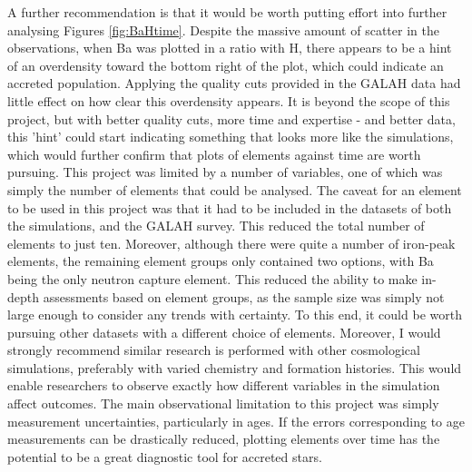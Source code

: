 \documentclass[fleqn,usenatbib]{mnras}
\begin{document}
A further recommendation is that it would be worth putting effort into further analysing Figures \ref{fig:BaHtime}. Despite the massive amount of scatter in the observations, when Ba was plotted in a ratio with H, there appears to be a hint of an overdensity toward the bottom right of the plot, which could indicate an accreted population. Applying the quality cuts provided in the GALAH data had little effect on how clear this overdensity appears. It is beyond the scope of this project, but with better quality cuts, more time and expertise - and better data, this 'hint' could start indicating something that looks more like the simulations, which would further confirm that plots of elements against time are worth pursuing.  
This project was limited by a number of variables, one of which was simply the number of elements that could be analysed. The caveat for an element to be used in this project was that it had to be included in the datasets of both the simulations, and the GALAH survey. This reduced the total number of elements to just ten. Moreover, although there were quite a number of iron-peak elements, the remaining element groups only contained two options, with Ba being the only neutron capture element. This reduced the ability to make in-depth assessments based on element groups, as the sample size was simply not large enough to consider any trends with certainty. To this end, it could be worth pursuing other datasets with a different choice of elements.  
Moreover, I would strongly recommend similar research is performed with other cosmological simulations, preferably with varied chemistry and formation histories. This would enable researchers to observe exactly how different variables in the simulation affect outcomes. 
The main observational limitation to this project was simply measurement uncertainties, particularly in ages. If the errors corresponding to age measurements can be drastically reduced, plotting elements over time has the potential to be a great diagnostic tool for accreted stars. 



\end{document}
